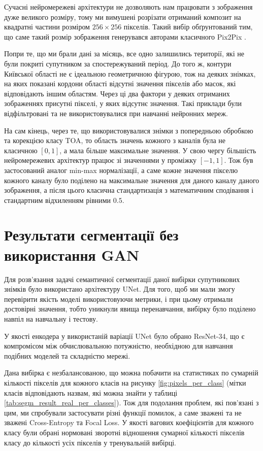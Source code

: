 Сучасні нейромережеві архітектури не дозволяють нам працювати
з зображення дуже великого розміру, тому ми вимушені
розрізати отриманий композит на квадратні частини розміром $256 \times 256$
пікселів. Такий вибір обґрунтований тим, що саме такий розмір
зображення генерувався авторами класичного Pix2Pix  \cite{pix2pix}.

Попри те, що ми брали дані за місяць, все одно залишились
території, які не були покриті супутником за спостережуваний період.
До того ж, контури Київської області не є ідеальною геометричною фігурою,
тож на деяких знімках, на яких показані кордони області відсутні значення
пікселів або масок, які відповідають іншим областям.
Через ці два фактори у деяких отриманих зображеннях
присутні пікселі, у яких відсутнє значення.
Такі приклади були відфільтровані та не
використовувалися при навчанні нейронних мереж.

На сам кінець, через те, що використовувалися знімки з
попередньою обробкою та корекцією класу TOA, то
область значень кожного з каналів була не класичною
$[0, 1]$, а мала більше максимальне значення.
У свою чергу більшість нейромережевих архітектур працює зі
значеннями у проміжку $[-1, 1]$.
Тож був застосований аналог min-max нормалізації, а саме
кожне значення пікселю кожного каналу було поділено на
максимальне значення для даного каналу даного зображення,
а після цього класична стандартизація з математичним
сподівання і стандартним відхиленням рівними $0.5$.

\section{Результати сегментації без використання GAN}

Для розв'язання задачі семантичної сегментації
даної вибірки супутникових знімків було використано
архітектуру UNet. Для того, щоб ми мали змогу перевірити
якість моделі використовуючи метрики, і при цьому
отримали достовірні значення, тобто уникнули явища
перенавчання, вибірку було поділено навпіл на навчальну і тестову.

У якості енкодера у використаній варіації UNet було обрано
ResNet-34, що є компромісом між обчислювальною потужністю,
необхідною для навчання подібних моделей та
складністю мережі.

Дана вибірка є незбалансованою, що можна побачити на
статистиках по сумарній кількості пікселів
для кожного класів на рисунку \ref{fig:pixels_per_class}
(мітки класів відповідають назвам, які можна знайти
у таблиці \ref{tab:segm_result_real_per_classes}).
Тож для подолання проблем, які пов'язані з цим, ми спробували
застосувати різні функції помилок, а саме зважені та
не зважені Cross-Entropy
та Focal Loss. У якості вагових коефіцієнтів для кожного
класу були обрані нормовані зворотні відношення сумарної кількості пікселів класу
до кількості усіх пікселів у тренувальній вибірці.

